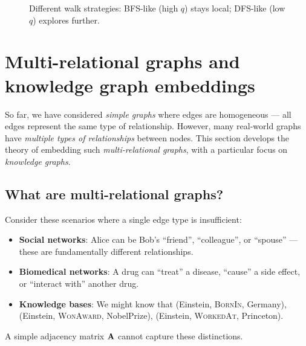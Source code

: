 \begin{notechapter}
\begin{figure}[htbp]
\caption{Different walk strategies: BFS-like (high $q$) stays local; DFS-like (low $q$) explores further.}
\label{shallow-embeddings:fig:bfs_dfs}
\end{figure}


\section{Multi-relational graphs and knowledge graph embeddings}

So far, we have considered \emph{simple graphs} where edges are homogeneous --- all edges represent the same type of relationship. However, many real-world graphs have \emph{multiple types of relationships} between nodes. This section develops the theory of embedding such \emph{multi-relational graphs}, with a particular focus on \emph{knowledge graphs}.

\subsection{What are multi-relational graphs?}

\begin{intuition}[Motivation]
Consider these scenarios where a single edge type is insufficient:
\begin{itemize}
    \item \textbf{Social networks}: Alice can be Bob's ``friend'', ``colleague'', or ``spouse'' --- these are fundamentally different relationships.
    \item \textbf{Biomedical networks}: A drug can ``treat'' a disease, ``cause'' a side effect, or ``interact with'' another drug.
    \item \textbf{Knowledge bases}: We might know that (Einstein, \textsc{BornIn}, Germany), (Einstein, \textsc{WonAward}, NobelPrize), (Einstein, \textsc{WorkedAt}, Princeton).
\end{itemize}
A simple adjacency matrix $\mathbf{A}$ cannot capture these distinctions.
\end{intuition}


\end{notechapter}

